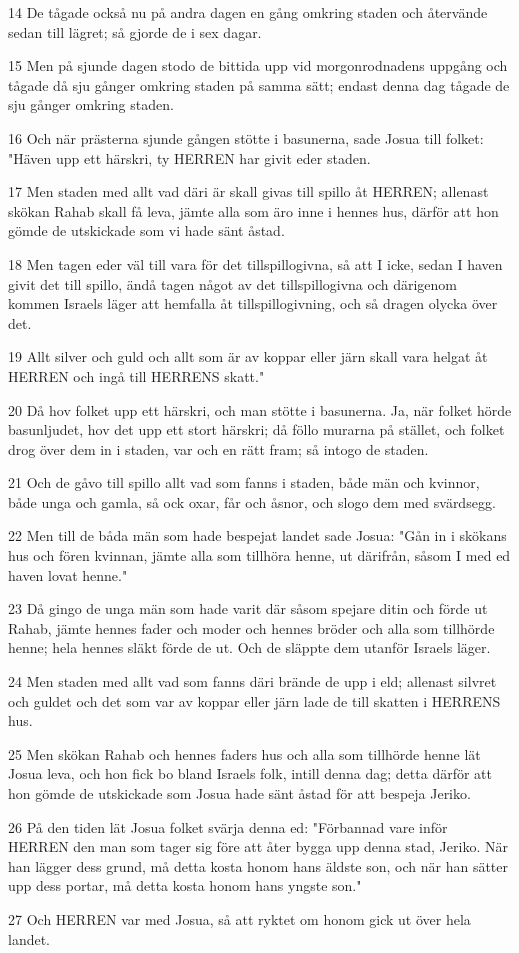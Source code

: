 \par 14 De tågade också nu på andra dagen en gång omkring staden och återvände sedan till lägret; så gjorde de i sex dagar.
\par 15 Men på sjunde dagen stodo de bittida upp vid morgonrodnadens uppgång och tågade då sju gånger omkring staden på samma sätt; endast denna dag tågade de sju gånger omkring staden.
\par 16 Och när prästerna sjunde gången stötte i basunerna, sade Josua till folket: "Häven upp ett härskri, ty HERREN har givit eder staden.
\par 17 Men staden med allt vad däri är skall givas till spillo åt HERREN; allenast skökan Rahab skall få leva, jämte alla som äro inne i hennes hus, därför att hon gömde de utskickade som vi hade sänt åstad.
\par 18 Men tagen eder väl till vara för det tillspillogivna, så att I icke, sedan I haven givit det till spillo, ändå tagen något av det tillspillogivna och därigenom kommen Israels läger att hemfalla åt tillspillogivning, och så dragen olycka över det.
\par 19 Allt silver och guld och allt som är av koppar eller järn skall vara helgat åt HERREN och ingå till HERRENS skatt."
\par 20 Då hov folket upp ett härskri, och man stötte i basunerna. Ja, när folket hörde basunljudet, hov det upp ett stort härskri; då föllo murarna på stället, och folket drog över dem in i staden, var och en rätt fram; så intogo de staden.
\par 21 Och de gåvo till spillo allt vad som fanns i staden, både män och kvinnor, både unga och gamla, så ock oxar, får och åsnor, och slogo dem med svärdsegg.
\par 22 Men till de båda män som hade bespejat landet sade Josua: "Gån in i skökans hus och fören kvinnan, jämte alla som tillhöra henne, ut därifrån, såsom I med ed haven lovat henne."
\par 23 Då gingo de unga män som hade varit där såsom spejare ditin och förde ut Rahab, jämte hennes fader och moder och hennes bröder och alla som tillhörde henne; hela hennes släkt förde de ut. Och de släppte dem utanför Israels läger.
\par 24 Men staden med allt vad som fanns däri brände de upp i eld; allenast silvret och guldet och det som var av koppar eller järn lade de till skatten i HERRENS hus.
\par 25 Men skökan Rahab och hennes faders hus och alla som tillhörde henne lät Josua leva, och hon fick bo bland Israels folk, intill denna dag; detta därför att hon gömde de utskickade som Josua hade sänt åstad för att bespeja Jeriko.
\par 26 På den tiden lät Josua folket svärja denna ed: "Förbannad vare inför HERREN den man som tager sig före att åter bygga upp denna stad, Jeriko. När han lägger dess grund, må detta kosta honom hans äldste son, och när han sätter upp dess portar, må detta kosta honom hans yngste son."
\par 27 Och HERREN var med Josua, så att ryktet om honom gick ut över hela landet.

